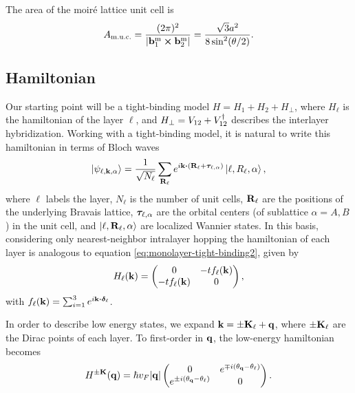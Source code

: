The area of the moiré lattice unit cell is
\begin{equation} \label{eq:moire-unitcell}
A_{\text{m.u.c.}} = \frac{(2\pi)^2}{\abs{{\vb{b}}_1^{\text{m}} \cross {\vb{b}}_2^{\text{m}}}} = \frac{\sqrt{3} a^2}{8 \sin[2](\theta/2)}.
\end{equation}

\subsection{Hamiltonian}

Our starting point will be a tight-binding model $ H = H_1 + H_2 + H_{\perp} $, where $H_\ell$ is the hamiltonian of the layer $\ell$, and $H_\perp = V_{12} + V_{12}^{\dagger}$ describes the interlayer hybridization. Working with a tight-binding model, it is natural to write this hamiltonian in terms of Bloch waves
\begin{equation} \label{eq:BM-blochwave}
\ket{\psi_{\ell, \k, \alpha}} = \frac{1}{\sqrt{N_\ell}} \sum_{\R_\ell} e^{i \k \vdot (\R_\ell + \vtau_{\ell,\alpha})} \ket{\ell, R_\ell, \alpha},
\end{equation}
where $\ell$ labels the layer, $N_\ell$ is the number of unit cells, ${\vb{R}}_\ell$ are the positions of the underlying Bravais lattice, ${\bm{\tau}}_{\ell,\alpha}$ are the orbital centers (of sublattice $\alpha = A,B$) in the unit cell, and $\ket{\ell,{\vb{R}}_\ell,\alpha}$ are localized Wannier states. In this basis, considering only nearest-neighbor intralayer hopping the hamiltonian of each layer is analogous to equation \ref{eq:monolayer-tight-binding2}, given by
\begin{equation} \label{eq:blg-eachlayer-hamil}
H_\ell({\vb{k}}) =
\begin{pmatrix}
0 & -t f_\ell({\vb{k}}) \\
-t f_\ell({\vb{k}}) & 0
\end{pmatrix},
\end{equation}
with $f_\ell(\k) = \sum_{i=1}^{3} e^{i\k \vdot \vdelta_\ell}$.

In order to describe low energy states, we expand ${\vb{k}} = \pm {\vb{K}}_\ell + {\vb{q}}$, where $\pm {\vb{K}}_\ell$ are the Dirac points of each layer. To first-order in ${\vb{q}}$, the low-energy hamiltonian becomes
\begin{equation} \label{eq:blg-eachlayer-hamil-lowenergy}
H^{\pm {\vb{K}}}({\vb{q}}) = \hbar v_F \abs{{\vb{q}}}
\begin{pmatrix}
0 & e^{\mp i (\theta_{\vb{q}} - \theta_\ell)} \\
e^{\pm i (\theta_{\vb{q}} - \theta_\ell)} & 0
\end{pmatrix}.
\end{equation}


